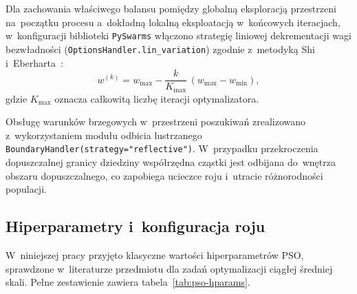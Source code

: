 Dla zachowania właściwego balansu pomiędzy globalną eksploracją przestrzeni na~początku procesu a~dokładną lokalną eksploatacją w~końcowych iteracjach, w~konfiguracji biblioteki \texttt{PySwarms} włączono strategię liniowej dekrementacji wagi bezwładności (\texttt{OptionsHandler.lin\_variation}) zgodnie z~metodyką Shi i~Eberharta~\cite{shi1998pso}:
\begin{equation}
    w^{(k)} = w_{\max} - \frac{k}{K_{\max}}\,(w_{\max} - w_{\min}),
    \label{eq:pso-inertia}
\end{equation}
gdzie $K_{\max}$ oznacza całkowitą liczbę iteracji optymalizatora.

Obsługę warunków brzegowych w~przestrzeni poszukiwań zrealizowano z~wykorzystaniem modułu odbicia lustrzanego \texttt{BoundaryHandler(strategy="reflective")}. W~przypadku przekroczenia dopuszczalnej granicy dziedziny współrzędna cząstki jest odbijana do~wnętrza obszaru dopuszczalnego, co zapobiega ucieczce roju i~utracie różnorodności populacji.

\subsection{Hiperparametry i~konfiguracja roju}
\label{subsec:pso-config}

W~niniejszej pracy przyjęto klasyczne wartości hiperparametrów PSO, sprawdzone w~literaturze przedmiotu dla zadań optymalizacji ciągłej średniej skali. Pełne zestawienie zawiera tabela~\ref{tab:pso-hparams}.

